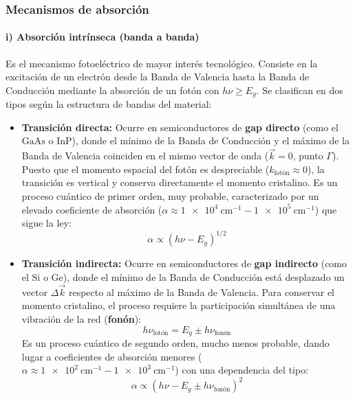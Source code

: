 \subsubsection{Mecanismos de absorción}

\paragraph{i) Absorción intrínseca (banda a banda)}
Es el mecanismo fotoeléctrico de mayor interés tecnológico. Consiste en la excitación de un electrón desde la Banda de Valencia hasta la Banda de Conducción mediante la absorción de un fotón con $h\nu \ge E_g$. Se clasifican en dos tipos según la estructura de bandas del material:

\begin{itemize}
    \item \textbf{Transición directa:} 
    Ocurre en semiconductores de \textbf{gap directo} (como el $\text{GaAs}$ o $\text{InP}$), donde el mínimo de la Banda de Conducción y el máximo de la Banda de Valencia coinciden en el mismo vector de onda ($\vec{k} = 0$, punto $\Gamma$). Puesto que el momento espacial del fotón es despreciable ($k_{\text{fotón}} \approx 0$), la transición es vertical y conserva directamente el momento cristalino. Es un proceso cuántico de primer orden, muy probable, caracterizado por un elevado coeficiente de absorción ($\alpha \approx \SI{1e4}{\cm^{-1}} - \SI{1e5}{\cm^{-1}}$) que sigue la ley:
    \[
    \alpha \propto (h\nu - E_g)^{1/2}
    \]

    \item \textbf{Transición indirecta:} 
    Ocurre en semiconductores de \textbf{gap indirecto} (como el $\text{Si}$ o $\text{Ge}$), donde el mínimo de la Banda de Conducción está desplazado un vector $\Delta \vec{k}$ respecto al máximo de la Banda de Valencia. Para conservar el momento cristalino, el proceso requiere la participación simultánea de una vibración de la red (\textbf{fonón}):
    \[
    h\nu_{\text{fotón}} = E_g \pm h\nu_{\text{fonón}}
    \]
    Es un proceso cuántico de segundo orden, mucho menos probable, dando lugar a coeficientes de absorción menores ($\alpha \approx \SI{1e2}{\cm^{-1}} - \SI{1e3}{\cm^{-1}}$) con una dependencia del tipo:
    \[
    \alpha \propto (h\nu - E_g \pm h\nu_{\text{fonón}})^2
    \]
\end{itemize}

